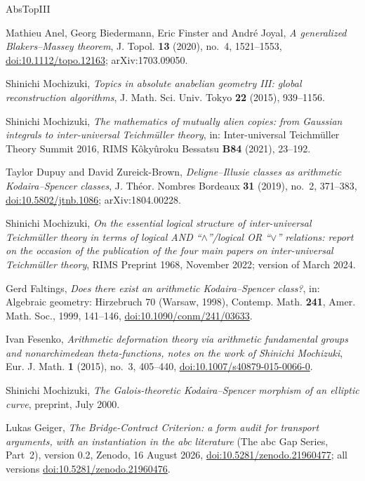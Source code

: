 \documentclass[11pt,a4paper]{article}
\numberwithin{table}{section}
\theoremstyle{plain}
\theoremstyle{definition}
\begin{document}
\begin{thebibliography}{AbsTopIII}\raggedright
{}
Mathieu Anel, Georg Biedermann, Eric Finster and Andr\'e Joyal, \emph{A generalized {B}lakers--{M}assey theorem},
J. Topol. \textbf{13} (2020), no.~4, 1521--1553, \href{https://doi.org/10.1112/topo.12163}{doi:10.1112/topo.12163};
arXiv:1703.09050.

Shinichi Mochizuki, \emph{Topics in absolute anabelian geometry {III}: global reconstruction algorithms}, J. Math. Sci.
Univ. Tokyo \textbf{22} (2015), 939--1156.

Shinichi Mochizuki, \emph{The mathematics of mutually alien copies: from {G}aussian integrals to inter-universal
{T}eichm\"uller theory}, in: Inter-universal Teichm\"uller Theory Summit 2016, RIMS K\^oky\^uroku Bessatsu \textbf{B84}
(2021), 23--192.

Taylor Dupuy and David Zureick-Brown, \emph{Deligne--{I}llusie classes as arithmetic {K}odaira--{S}pencer classes},
J. Th\'eor. Nombres Bordeaux \textbf{31} (2019), no.~2, 371--383,
\href{https://doi.org/10.5802/jtnb.1086}{doi:10.5802/jtnb.1086}; arXiv:1804.00228.

Shinichi Mochizuki, \emph{On the essential logical structure of inter-universal {T}eichm\"uller theory in terms of
logical {AND} ``$\wedge$''/logical {OR} ``$\vee$'' relations: report on the occasion of the publication of the four main
papers on inter-universal {T}eichm\"uller theory}, RIMS Preprint 1968, November 2022; version of March 2024.

Gerd Faltings, \emph{Does there exist an arithmetic {K}odaira--{S}pencer class?}, in: Algebraic geometry: Hirzebruch 70
(Warsaw, 1998), Contemp. Math. \textbf{241}, Amer. Math. Soc., 1999, 141--146,
\href{https://doi.org/10.1090/conm/241/03633}{doi:10.1090/conm/241/03633}.

Ivan Fesenko, \emph{Arithmetic deformation theory via arithmetic fundamental groups and nonarchimedean
theta-functions, notes on the work of {S}hinichi {M}ochizuki}, Eur. J. Math. \textbf{1} (2015), no.~3, 405--440,
\href{https://doi.org/10.1007/s40879-015-0066-0}{doi:10.1007/s40879-015-0066-0}.

Shinichi Mochizuki, \emph{The {G}alois-theoretic {K}odaira--{S}pencer morphism of an elliptic curve}, preprint, July
2000.

Lukas Geiger, \emph{The {B}ridge-{C}ontract {C}riterion: a form audit for transport arguments, with an instantiation in
the abc literature} (The abc Gap Series, Part~2), version 0.2, Zenodo, 16 August 2026,
\href{https://doi.org/10.5281/zenodo.21960477}{doi:10.5281/zenodo.21960477}; all versions
\href{https://doi.org/10.5281/zenodo.21960476}{doi:10.5281/zenodo.21960476}.


\end{thebibliography}
\end{document}

